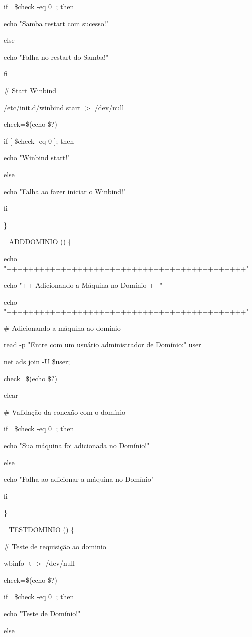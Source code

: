 {   if [ \$check -eq 0 ]; then

      echo "Samba restart com sucesso!"

   else

      echo "Falha no restart do Samba!"

   fi

    \# Start Winbind

    /etc/init.d/winbind start $>$ /dev/null

    check=\$(echo \$?)

   if [ \$check -eq 0 ]; then

      echo "Winbind start!"

   else

      echo "Falha ao fazer iniciar o Winbind!"

   fi

\}

\_ADDDOMINIO () \{
    
 
  echo "++++++++++++++++++++++++++++++++++++++++++++"

   echo "++  Adicionando a Máquina no Domínio  ++"

   echo "++++++++++++++++++++++++++++++++++++++++++++"

   \# Adicionando a máquina ao domínio

        read -p "Entre com um usuário administrador de Domínio:" user   

   net ads join -U \$user;

        check=\$(echo \$?)

        clear

        \# Validação da conexão com o domínio

        if [ \$check -eq 0 ]; then

      echo "Sua máquina foi adicionada no Domínio!"

   else

      echo "Falha ao adicionar a máquina no Domínio"

   fi

\}

\_TESTDOMINIO () \{

        \# Teste de requisição ao dominio

        wbinfo -t $>$ /dev/null

        check=\$(echo \$?)

   if [ \$check -eq 0 ]; then

      echo "Teste de Domínio!"

   else

}
